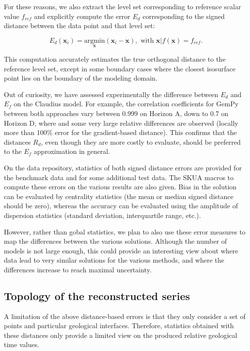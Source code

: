 \documentclass[preprint]{ring20}
\newcommand{\bx}{\mathbf{x}}
\begin{document}
{For these reasons, we also extract the level set corresponding to reference scalar value $f_{ref}$ and explicitly compute the error $E_d$ corresponding to the signed distance between the data point and that level set: 

\begin{equation}
\label{eq:errd}
E_d(\bx_i) = \underset{\bx}{\mathrm{argmin}} \left(\bx_i - \bx \right), \mbox{ with } \bx | f(\bx) = f_{ref}.
\end{equation}

This computation accurately estimates the true orthogonal distance to the reference level set, except in some boundary cases where the closest isosurface point lies on the boundary of the modeling domain.  

Out of curiosity, we have assessed experimentally the difference between $E_d$ and $E_f$ on the Claudius model. For example, the correlation coefficients for GemPy between both approaches vary between 0.999 on Horizon A, down to 0.7 on Horizon D, where and some very large relative differences are observed (locally  more than 100\% error for the gradient-based distance). This confirms that the distances $R_d$, even though they are more costly to evaluate, should be preferred to the $E_f$ approximation in general.  

On the data repository, statistics of both signed distance errors are provided for the benchmark data and for some additional test data. The SKUA macros to compute these errors on the various results are also given. Bias in the solution can be evaluated by centrality statistics (the mean or median signed distance should be zero), whereas the accuracy can be evaluated using the amplitude of dispersion statistics (standard deviation, interquartile range, etc.). 

However, rather than gobal statistics, we plan to also use these error measures to map the differences between the various solutions. Although the number of models is not large enough, this could provide an interesting view about where data lead to very similar solutions for the various methods, and where the differences increase to reach maximal uncertainty.  


\subsection{Topology of the reconstructed series}

A limitation of the above distance-based errors is that they only consider a set of points and particular geological interfaces. Therefore, statistics obtained with these distances only provide a limited view on the produced relative geological time values. 

}
\end{document}
